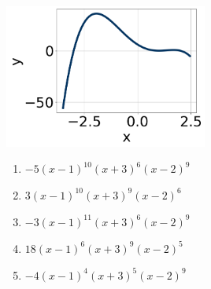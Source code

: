 \documentclass[14pt]{extbook}
\begin{document}
\begin{enumerate}
{\begin{center}
    \includegraphics[width=0.5\textwidth]{../Figures/polyGraphToFunctionCopyB.png}
\end{center}
\begin{enumerate}[label=\Alph*.]
\item \( -5(x - 1)^{10} (x + 3)^{6} (x - 2)^{9} \)
\item \( 3(x - 1)^{10} (x + 3)^{9} (x - 2)^{6} \)
\item \( -3(x - 1)^{11} (x + 3)^{6} (x - 2)^{9} \)
\item \( 18(x - 1)^{6} (x + 3)^{9} (x - 2)^{5} \)
\item \( -4(x - 1)^{4} (x + 3)^{5} (x - 2)^{9} \)


\end{enumerate}}
\end{enumerate}
\end{document}

